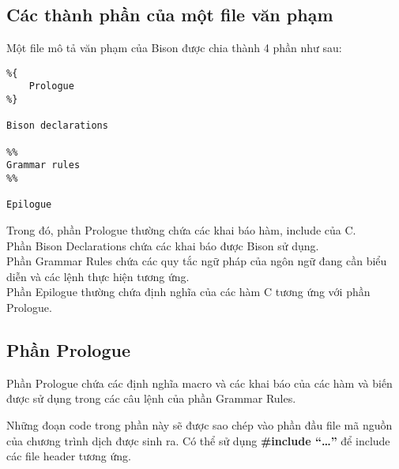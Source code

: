 \documentclass[../report.tex]{subfiles}
\begin{document}
\subsection{Các thành phần của một file văn phạm}
Một file mô tả văn phạm của Bison được chia thành 4 phần như sau: 
\cite{grammar-file}
\begin{lstlisting}
%{
    Prologue
%}

Bison declarations

%%
Grammar rules
%%

Epilogue
\end{lstlisting}
Trong đó, phần Prologue thường 
chứa các khai báo hàm, include của C. \\
Phần Bison Declarations chứa các khai báo được Bison sử dụng. \\
Phần Grammar Rules chứa các quy tắc ngữ pháp của ngôn ngữ đang cần biểu diễn và 
các lệnh thực hiện tương ứng. \\
Phần Epilogue thường chứa định nghĩa của các hàm C tương ứng với phần 
Prologue.

\subsection{Phần Prologue}
Phần Prologue chứa các định nghĩa macro và các khai báo của các 
hàm và biến được sử dụng trong các câu lệnh của phần Grammar Rules. 
\cite{prologue}

Những đoạn code trong phần này sẽ được sao chép vào phần đầu 
file mã nguồn của chương trình dịch được sinh ra. Có thể sử dụng 
\textbf{\#include ``\ldots''} để include các file header tương ứng. 
\end{document}

